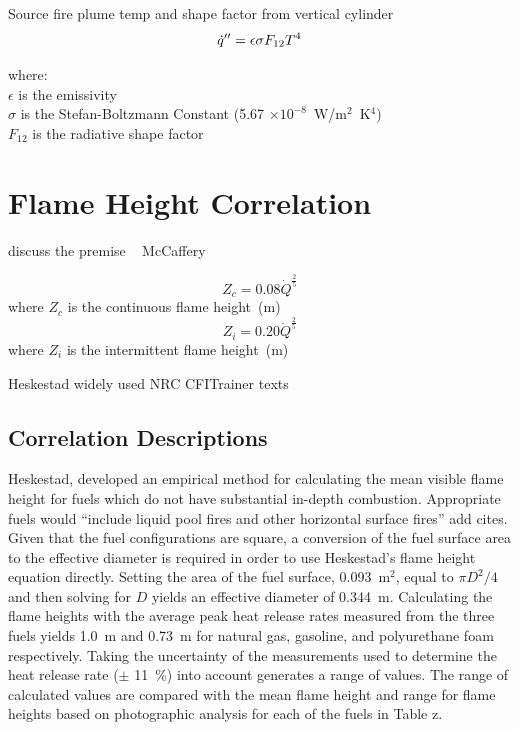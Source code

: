 \documentclass[twoside]{uocthesis}
\begin{document}
Source fire plume temp and shape factor from vertical cylinder
\begin{equation}\label{eq:source_fire}
\dot{q}'' = \epsilon \sigma F_{12} T^4  \\
\end{equation}

\begin{tabbing}
where: \=  \\
\> $\epsilon$ is the emissivity  \\
\> $\sigma$ is the Stefan-Boltzmann Constant (5.67 $\times 10^{−8}$~W/m$^2$~K$^4$)  \\
\> $F_{12}$ is the radiative shape factor \\
\end{tabbing}

\section{Flame Height Correlation}

discuss the premise    ~\cite{McCaffrey:1979}
McCaffery

\begin{equation}\label{eq:z_c}
Z_c = 0.08 \dot{Q}^{\frac{2}{5}}
\end{equation}
where $Z_c$ is the continuous flame height~(m)
\begin{equation}\label{eq:z_i}
Z_i = 0.20 \dot{Q}^{\frac{2}{5}}
\end{equation}
where $Z_i$ is the intermittent flame height~(m)

Heskestad widely used  NRC CFITrainer  texts



\subsection{Correlation Descriptions}
Heskestad, developed an empirical method for calculating the mean visible flame height for fuels which do not have substantial in-depth combustion.  Appropriate fuels would ``include liquid pool fires and other horizontal surface fires'' add cites.  Given that the fuel configurations are square, a conversion of the fuel surface area to the effective diameter is required in order to use Heskestad's flame height equation directly.  Setting the area of the fuel surface, 0.093~m$^2$, equal to $\pi D^2/4$ and then solving for $D$ yields an effective diameter of 0.344~m.
Calculating the flame heights with the average peak heat release rates measured from the three fuels yields 1.0~m and 0.73~m for natural gas, gasoline, and polyurethane foam respectively. Taking the uncertainty of the measurements used to determine the heat release rate ($\pm$ 11~\%) into account generates a range of values.   The range of calculated values are compared with the mean flame height and range for flame heights  based on photographic analysis for each of the fuels in Table z.
\end{document}

